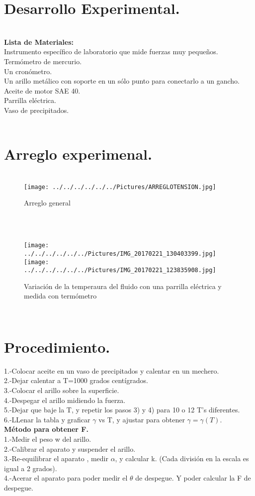 \documentclass[10pt,a4paper]{article}
\begin{document}
\section*{Desarrollo Experimental.}\\
\textbf{Lista de Materiales:} \\
Instrumento espec\'{i}fico de laboratorio que mide fuerzas muy peque\~{n}os.\\
Term\'{o}metro de mercurio. \\
Un cron\'{o}metro. \\
Un arillo met\'{a}lico con soporte en un s\'{o}lo punto para conectarlo a un gancho. \\
Aceite de motor SAE 40.\\
Parrilla el\'{e}ctrica. \\
Vaso de precipitados.\\
\\
\section*{Arreglo experimenal.}
\begin{figure}[hbtp]
\centering
\\
\texttt{[image: ../../../../../../Pictures/ARREGLOTENSION.jpg]} 
\caption{Arreglo general}
\end{figure} 
\\
\begin{figure}[hbtp]
\centering
\\
\texttt{[image: ../../../../../../Pictures/IMG\_20170221\_130403399.jpg]}  
\texttt{[image: ../../../../../../Pictures/IMG\_20170221\_123835908.jpg]} 
\caption{Variaci\'{o}n de la temperaura del fluido con una parrilla el\'{e}ctrica y medida con term\'{o}metro} 
\end{figure} 
\\
\section*{Procedimiento.}
1.-Colocar aceite en un vaso de precipitados y calentar en un mechero.\\
2.-Dejar calentar a T=1000 grados cent\'{i}grados.\\
3.-Colocar el arillo sobre la superficie. \\
4.-Despegar el arillo midiendo la fuerza.\\
5.-Dejar que baje la T, y repetir los pasos 3) y 4) para 10 o 12 T's diferentes.\\
6.-LLenar la tabla y graficar $\gamma$ vs T, y ajustar para obtener $\gamma= \gamma (T)$.\\
\textbf{M\'{e}todo para obtener F.}\\
1.-Medir el peso w del arillo.\\
2.-Calibrar el aparato y suspender el arillo.\\
3.-Re-equilibrar el aparato , medir $\alpha $, y calcular k. (Cada divisi\'{o}n en la escala es igual a 2 grados). \\
4.-Acerar el aparato para poder medir el $\theta$ de despegue. Y poder calcular la F de despegue.\\ 
\end{document}
